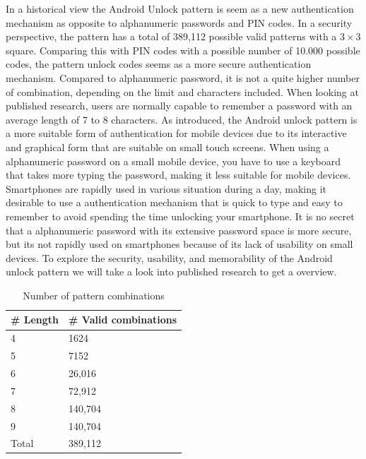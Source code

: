   In a historical view the Android Unlock pattern is seem as a new authentication mechanism as opposite to alphanumeric passwords and PIN codes. In a security perspective, the pattern has a total of 389,112 possible valid patterns with a $3\times3$ square. Comparing this with PIN codes with a possible number of 10.000 possible codes, the pattern unlock codes seems as a more secure authentication mechanism. Compared to alphanumeric password, it is not a quite higher number of combination, depending on the limit and characters included. When looking at published research, users are normally capable to remember a password with an average length of 7 to 8 characters. As introduced, the Android unlock pattern is a more suitable form of authentication for mobile devices due to its interactive and graphical form that are suitable on small touch screens. When using a alphanumeric password on a small mobile device, you have to use a keyboard that takes more typing the password, making it less suitable for mobile devices. Smartphones are rapidly used in various situation during a day, making it desirable to use a authentication mechanism that is quick to type and easy to remember to avoid spending the time unlocking your smartphone. It is no secret that a alphanumeric password with its extensive password space is more secure, but its not rapidly used on smartphones because of its lack of usability on small devices. To explore the security, usability, and memorability of the Android unlock pattern we will take a look into published research to get a overview.

	  \begin{table}[H]
	    \centering
	    \begin{tabular}{| l | l |}
	      \hline
	      {\bf \# Length} & {\bf \# Valid combinations} \\ \hline
	      4 & 1624 \\
	      5 & 7152 \\
	      6 & 26,016 \\
	      7 & 72,912 \\
	      8 & 140,704 \\
	      9 & 140,704 \\ \hline
	      Total & 389,112\\ \hline
	    \end{tabular}
	    \caption{Number of pattern combinations}
	    \label{tab:combinations}
	  \end{table}

